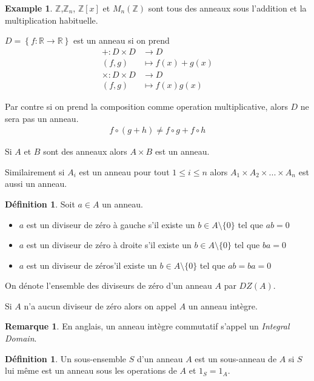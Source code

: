 \documentclass{book}
\theoremstyle{plain}
\theoremstyle{definition}
\newtheorem{defn}[thm]{Définition} %
\newtheorem{ex}[thm]{Example} %
\newtheorem{rmrk}[thm]{Remarque}
\begin{document}
\begin{ex}
$\mathbb{Z}$,$\mathbb{Z}_n$, $\mathbb{Z}[x]$ et $M_n\left(\mathbb{Z}\right)$ sont tous des anneaux sous l'addition et la multiplication habituelle.

$D=\left\{ f:\mathbb{R}\rightarrow\mathbb{R}\right\}$ est un anneau si on prend
\begin{align*}
+:D\times D&\rightarrow D\\
(f,g)&\mapsto f(x)+g(x)\\
\times:D\times D&\rightarrow D\\
(f,g)&\mapsto f(x)g(x)
\end{align*}

Par contre si on prend la composition comme operation multiplicative, alors $D$ ne sera pas un anneau.
\begin{align*}
f\circ(g+h)\neq f\circ g+f\circ h
\end{align*}

Si $A$ et $B$ sont des anneaux alors $A\times B$ est un anneau.

Similairement si $A_i$ est un anneau pour tout $1\leq i\leq n$ alors $A_1\times A_2\times...\times A_n$ est aussi un anneau.
\end{ex}

\begin{defn}
\label{def:ring-div0}
Soit $a\in A$ un anneau.

\begin{itemize}
\item $a$ est un diviseur de zéro à gauche s'il existe un $b\in A\setminus\{0\}$ tel que $ab=0$
\item $a$ est un diviseur de zéro à droite s'il existe un $b\in A\setminus\{0\}$ tel que $ba=0$
\item $a$ est un diviseur de zéros'il existe un $b\in A\setminus\{0\}$ tel que $ab=ba=0$
\end{itemize}

On dénote l'ensemble des diviseurs de zéro d'un anneau $A$ par $DZ(A)$.

Si $A$ n'a aucun diviseur de zéro alors on appel $A$ un anneau intègre.
\end{defn}

\begin{rmrk}
En anglais, un anneau intègre commutatif s'appel un \textit{Integral Domain}.
\end{rmrk}

\begin{defn}
Un sous-ensemble  $S$ d'un anneau $A$ est un sous-anneau de $A$ si $S$ lui même est un anneau sous les operations de $A$ et $1_S=1_A$.
\end{defn}
\end{document}
